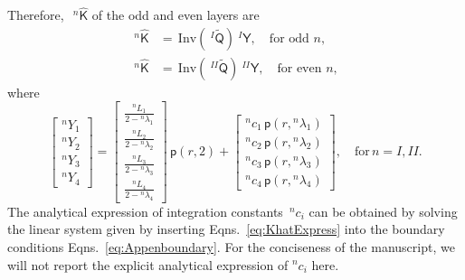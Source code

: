 \documentclass[preprint,10pt,times]{elsarticle}
\numberwithin{equation}{section}
\renewcommand{\u}[1]{\boldsymbol{#1}}
\newcommand{\usf}[1]{\u{\mathsf #1}}
\newcommand{\pr}[1]{\left( #1 \right)}
\newcommand{\p}{\,\mathsf{p}}
\newcommand{\Inv}{\,\mathrm{Inv}}
\renewcommand{\>}{$\Rightarrow$}
\begin{document}
Therefore,~$~^{n}{\hat{\usf{K}}}$ of the odd and even layers are
\begin{subequations}
\begin{align}
~^{n}{\hat{\usf{K}}} & = \Inv\left( ~^{I}\tilde{\usf{Q}} \right) ~^{I}\usf{Y}, \quad \text{for odd~$n$}, \\
~^{n}{\hat{\usf{K}}} & = \Inv\left( ~^{II}\tilde{\usf{Q}} \right) ~^{II}\usf{Y}, \quad \text{for even~$n$},
\end{align}
\label{eq:KhatExpress}
\end{subequations}
where
\begin{equation}
	\begin{bmatrix}
	 {}^{n}\!{Y_{1}} \\ {}^{n}\!{Y_{2}} \\ {}^{n}\!{Y_{3}} \\ {}^{n}\!{Y_{4}}
	\end{bmatrix}
	=
	\begin{bmatrix}
	 \frac{{}^{n}\!{L_{1}}}{2-{}^{n}\!{\lambda_{1}}} \\ \frac{{}^{n}\!{L_{2}}}{2-{}^{n}\!{\lambda_{2}}} \\ \frac{{}^{n}\!{L_{3}}}{2-{}^{n}\!{\lambda_{3}}} \\ \frac{{}^{n}\!{L_{4}}}{2-{}^{n}\!{\lambda_{4}}}
	\end{bmatrix}\p\pr{r,2}
	+
	\begin{bmatrix}
	 {}^{n}\!{c_{1}} \p\pr{r,{}^{n}\!{\lambda_{1}}} \\ {}^{n}\!{c_{2}} \p\pr{r,{}^{n}\!{\lambda_{2}}} \\ {}^{n}\!{c_{3}} \p\pr{r,{}^{n}\!{\lambda_{3}}} \\ {}^{n}\!{c_{4}} \p\pr{r,{}^{n}\!{\lambda_{4}}}
	\end{bmatrix}, \quad \text{for} \, n = I, II.
\end{equation}
The analytical expression of integration constants~${}^{n}\!{c_{i}}$ can be obtained by solving the linear system given by inserting Eqns.~\eqref{eq:KhatExpress} into the boundary conditions Eqns.~\eqref{eq:Appenboundary}. For the conciseness of the manuscript, we will not report the explicit analytical expression of ${}^{n}\!{c_{i}}$ here.
\end{document}

